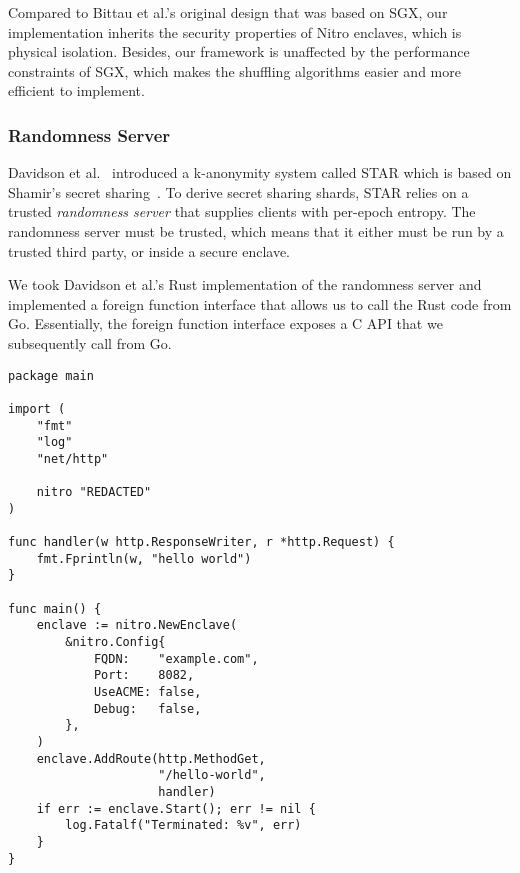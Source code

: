 Compared to Bittau et al.'s original design that was based on SGX, our implementation inherits the security properties of Nitro enclaves, which is physical isolation.  Besides, our framework is unaffected by the performance constraints of SGX, which makes the shuffling algorithms easier and more efficient to implement.

\subsubsection{Randomness Server}
\label{sec:randomness}

Davidson et al.~\cite{Davidson2021a} introduced a k-anonymity system called STAR which is based on Shamir's secret sharing~\cite{Shamir79a}.  To derive secret sharing shards, STAR relies on a trusted \emph{randomness server} that supplies clients with per-epoch entropy.  The randomness server must be trusted, which means that it either must be run by a trusted third party, or inside a secure enclave.


We took Davidson et al.'s Rust implementation of the randomness server and implemented a foreign function interface that allows us to call the Rust code from Go.  Essentially, the foreign function interface exposes a C API that we subsequently call from Go.

\begin{lstlisting}
package main

import (
    "fmt"
    "log"
    "net/http"

    nitro "REDACTED"
)

func handler(w http.ResponseWriter, r *http.Request) {
    fmt.Fprintln(w, "hello world")
}

func main() {
    enclave := nitro.NewEnclave(
        &nitro.Config{
            FQDN:    "example.com",
            Port:    8082,
            UseACME: false,
            Debug:   false,
        },
    )
    enclave.AddRoute(http.MethodGet,
                     "/hello-world",
                     handler)
    if err := enclave.Start(); err != nil {
        log.Fatalf("Terminated: %v", err)
    }
}
\end{lstlisting}
